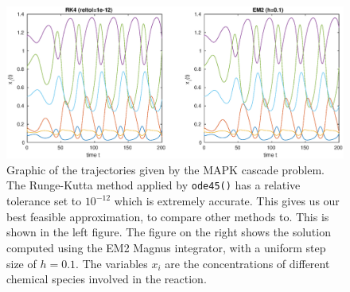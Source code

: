 \begin{figure}
    \centering
    \includegraphics[width=\linewidth]{Matlab/mapkdual.eps}
    \caption{
        Graphic of the trajectories given by the MAPK cascade problem.
        The Runge-Kutta method applied by \texttt{ode45()} has a relative tolerance set to $10^{-12}$ which is extremely accurate.
        This gives us our best feasible approximation, to compare other methods to.
        This is shown in the left figure.
        The figure on the right shows the solution computed using the EM2 Magnus integrator, with a uniform step size of $h=0.1$.
        The variables $x_i$ are the concentrations of different chemical species involved in the reaction.
    }
    \label{fig:mapkdual}
\end{figure}

